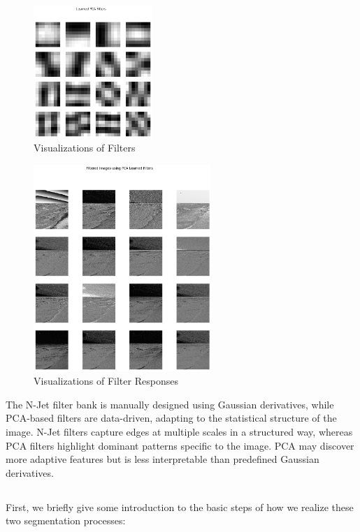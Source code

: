 \documentclass[12pt]{article}
\begin{document}
\begin{figure}[h]
    \centering
    \includegraphics[width=0.4\textwidth]{pics/a6-3.2-1.png}
    \caption{Visualizations of Filters}
    \label{3.2-1}
\end{figure}

\begin{figure}[h]
    \centering
    \includegraphics[width=0.6\textwidth]{pics/a6-3.2-2.png}
    \caption{Visualizations of Filter Responses}
    \label{3.2-2}
\end{figure}

The N-Jet filter bank is manually designed using Gaussian derivatives, while PCA-based filters are data-driven, adapting to the statistical structure of the image. N-Jet filters capture edges at multiple scales in a structured way, whereas PCA filters highlight dominant patterns specific to the image. PCA may discover more adaptive features but is less interpretable than predefined Gaussian derivatives.

\subsection{}
First, we briefly give some introduction to the basic steps of how we realize these two segmentation processes:
\end{document}
